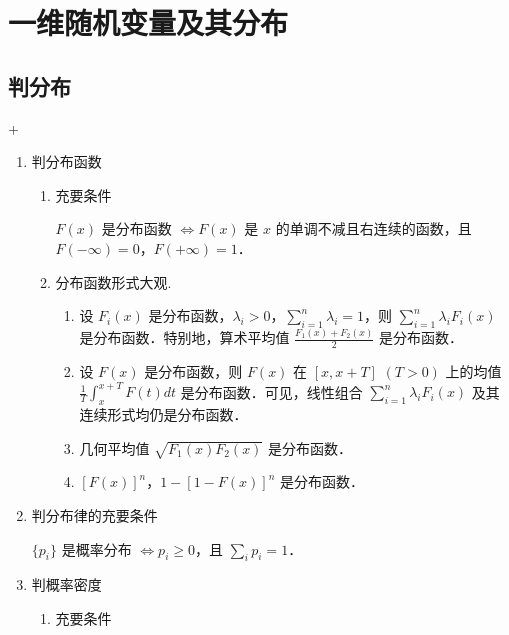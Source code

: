 \chapter{一维随机变量及其分布}

\section{判分布}
\DOne + \DTwoTwo
\begin{enumerate}
    \item 判分布函数
          \begin{enumerate}
              \item 充要条件

                    $F(x)$ 是分布函数 $\Leftrightarrow F(x)$ 是 $x$ 的单调不减且右连续的函数，且 $F(-\infty)=0$，$F(+\infty)=1$．
              \item 分布函数形式大观.
                    \begin{enumerate}
                        \item 设 $F_i(x)$ 是分布函数，$\lambda_i>0$，$\sum_{i=1}^{n}\lambda_i=1$，则 $\sum_{i=1}^{n}\lambda_iF_i(x)$ 是分布函数．特别地，算术平均值 $\frac{F_1(x)+F_2(x)}{2}$ 是分布函数．
                        \item 设 $F(x)$ 是分布函数，则 $F(x)$ 在 $[x,x+T]$ $(T>0)$ 上的均值 $\frac{1}{T}\int_{x}^{x+T}F(t)dt$ 是分布函数．可见，线性组合 $\sum_{i=1}^{n}\lambda_iF_i(x)$ 及其连续形式均仍是分布函数．
                        \item 几何平均值 $\sqrt{F_1(x)F_2(x)}$ 是分布函数．
                        \item $[F(x)]^n$，$1-[1-F(x)]^n$ 是分布函数．
                    \end{enumerate}
          \end{enumerate}
    \item 判分布律的充要条件

          $\{p_i\}$ 是概率分布 $\Leftrightarrow p_i\geqslant 0$，且 $\sum_{i}p_i=1$．
    \item 判概率密度
          \begin{enumerate}
              \item 充要条件


\end{enumerate}
\end{enumerate}
